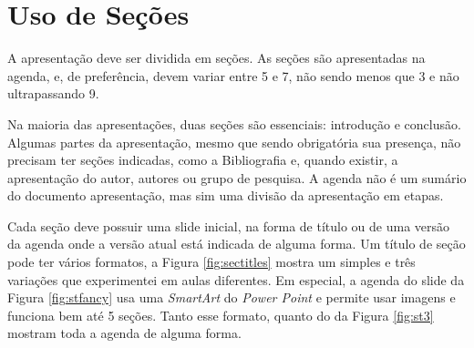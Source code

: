 \section{Uso de Seções}

A apresentação deve ser dividida em seções. As seções são apresentadas na agenda, e, de preferência, devem variar entre 5 e 7, não sendo menos que 3 e não ultrapassando 9.

Na maioria das apresentações, duas seções são essenciais: introdução e conclusão. Algumas partes da apresentação, mesmo que sendo obrigatória sua presença, não precisam ter seções indicadas, como a Bibliografia e, quando existir, a apresentação do autor, autores ou grupo de pesquisa. A agenda não é um sumário do documento apresentação, mas sim uma divisão da apresentação em etapas.

Cada seção deve possuir uma slide inicial, na forma de título ou de uma versão da agenda onde a versão atual está indicada de alguma forma. Um título de seção pode ter vários formatos, a Figura \ref{fig:sectitles} mostra um simples e três variações que experimentei em aulas diferentes. Em especial, a agenda do slide da Figura \ref{fig:stfancy} usa uma \textit{SmartArt} do \textit{Power Point} e permite usar imagens e funciona bem até 5 seções. Tanto esse formato, quanto do da Figura \ref{fig:st3} mostram toda a agenda de alguma forma.

